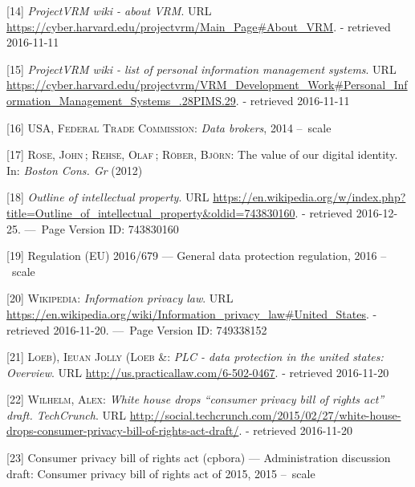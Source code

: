 \documentclass[12pt,english,a4paper,titlepage,cleardoublepage=empty,dottedtoc]{report}
\begin{document}
\hypertarget{ref-web_2010_projectvrm-wiki_about-vrm}{}
{[}14{]} \emph{ProjectVRM wiki - about VRM}. URL
\url{https://cyber.harvard.edu/projectvrm/Main_Page\#About_VRM}. -
retrieved 2016-11-11

\hypertarget{ref-web_2010_projectvrm-wiki_pims-example-list}{}
{[}15{]} \emph{ProjectVRM wiki - list of personal information management
systems}. URL
\url{https://cyber.harvard.edu/projectvrm/VRM_Development_Work\#Personal_Information_Management_Systems_.28PIMS.29}.
- retrieved 2016-11-11

\hypertarget{ref-report_2014_data-brokers}{}
{[}16{]} \textsc{USA, Federal Trade Commission}: \emph{Data brokers},
2014 --~scale

\hypertarget{ref-whitepaper_2012_the-value-of-our-digital-identity_definition}{}
{[}17{]} \textsc{Rose, John}\,; \textsc{Rehse, Olaf}\,; \textsc{Röber,
Björn}: The value of our digital identity. In: \emph{Boston Cons. Gr}
(2012)

\hypertarget{ref-web_2016_wikipedia_intellectual-property}{}
{[}18{]} \emph{Outline of intellectual property}. URL
\url{https://en.wikipedia.org/w/index.php?title=Outline_of_intellectual_property\&oldid=743830160}.
- retrieved 2016-12-25. ---~Page Version ID: 743830160

\hypertarget{ref-regulation_2016_eu_general-data-protection-regulation_definition}{}
{[}19{]} Regulation (EU) 2016/679 --- General data protection
regulation, 2016 --~scale

\hypertarget{ref-web_2016_wikipedia_information-privacy-law_us}{}
{[}20{]} \textsc{Wikipedia}: \emph{Information privacy law}. URL
\url{https://en.wikipedia.org/wiki/Information_privacy_law\#United_States}.
- retrieved 2016-11-20. ---~Page Version ID: 749338152

\hypertarget{ref-web_2016_data-protection-laws-in-the-us}{}
{[}21{]} \textsc{Loeb), Ieuan Jolly (Loeb \&}: \emph{PLC - data
protection in the united states: Overview}. URL
\url{http://us.practicallaw.com/6-502-0467}. - retrieved 2016-11-20

\hypertarget{ref-web_2015_white-house-releases-consumer-privacy-bill-draft}{}
{[}22{]} \textsc{Wilhelm, Alex}: \emph{White house drops ``consumer
privacy bill of rights act'' draft. TechCrunch}. URL
\url{http://social.techcrunch.com/2015/02/27/white-house-drops-consumer-privacy-bill-of-rights-act-draft/}.
- retrieved 2016-11-20

\hypertarget{ref-bill-draft_2015_us_consumer-privacy-bill-of-rights-act_definition}{}
{[}23{]} Consumer privacy bill of rights act (cpbora) --- Administration
discussion draft: Consumer privacy bill of rights act of 2015, 2015
--~scale
\end{document}
